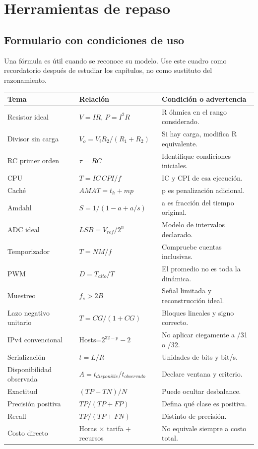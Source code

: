 \chapter{Herramientas de repaso}
\section{Formulario con condiciones de uso}
Una fórmula es útil cuando se reconoce su modelo. Use este cuadro como recordatorio después de estudiar los capítulos, no como sustituto del razonamiento.
\begin{longtable}{>{\raggedright\arraybackslash}p{}>{\raggedright\arraybackslash}p{}>{\raggedright\arraybackslash}p{}}
\toprule Tema & Relación & Condición o advertencia\\\midrule\endhead
Resistor ideal & $V=IR$, $P=I^2R$ & R óhmica en el rango considerado.\\
Divisor sin carga & $V_o=V_iR_2/(R_1+R_2)$ & Si hay carga, modifica R equivalente.\\
RC primer orden & $\tau=RC$ & Identifique condiciones iniciales.\\
CPU & $T=IC\,CPI/f$ & IC y CPI de esa ejecución.\\
Caché & $AMAT=t_h+m p$ & p es penalización adicional.\\
Amdahl & $S=1/(1-a+a/s)$ & a es fracción del tiempo original.\\
ADC ideal & $LSB=V_{ref}/2^n$ & Modelo de intervalos declarado.\\
Temporizador & $T=NM/f$ & Compruebe cuentas inclusivas.\\
PWM & $D=T_{alto}/T$ & El promedio no es toda la dinámica.\\
Muestreo & $f_s>2B$ & Señal limitada y reconstrucción ideal.\\
Lazo negativo unitario & $T=CG/(1+CG)$ & Bloques lineales y signo correcto.\\
IPv4 convencional & Hosts=$2^{32-p}-2$ & No aplicar ciegamente a /31 o /32.\\
Serialización & $t=L/R$ & Unidades de bits y bit/s.\\
Disponibilidad observada & $A=t_{disponible}/t_{observado}$ & Declare ventana y criterio.\\
Exactitud & $(TP+TN)/N$ & Puede ocultar desbalance.\\
Precisión positiva & $TP/(TP+FP)$ & Defina qué clase es positiva.\\
Recall & $TP/(TP+FN)$ & Distinto de precisión.\\
Costo directo & Horas × tarifa + recursos & No equivale siempre a costo total.\\
\bottomrule
\end{longtable}
